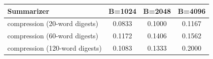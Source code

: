 \begin{tabular}{lccc}
\toprule
Summarizer & B=1024 & B=2048 & B=4096 \\
\midrule
compression (20-word digests) & 0.0833 & 0.1000 & 0.1167 \\
compression (60-word digests) & 0.1172 & 0.1406 & 0.1562 \\
compression (120-word digests) & 0.1083 & 0.1333 & 0.2000 \\
\bottomrule
\end{tabular}